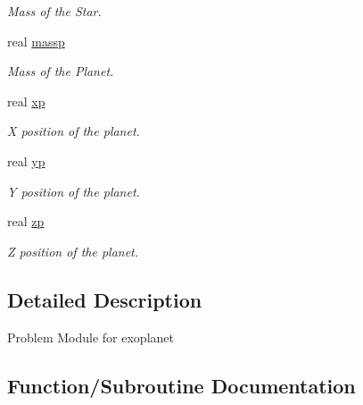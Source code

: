 \begin{DoxyCompactItemize}
\begin{DoxyCompactList}\small\item\em Mass of the Star. \end{DoxyCompactList}\item 
\hypertarget{namespaceexoplanet_a42dc35a9cdd9b1b8c10ddf245a1f2b8b}{}real \hyperlink{namespaceexoplanet_a42dc35a9cdd9b1b8c10ddf245a1f2b8b}{massp}\label{namespaceexoplanet_a42dc35a9cdd9b1b8c10ddf245a1f2b8b}

\begin{DoxyCompactList}\small\item\em Mass of the Planet. \end{DoxyCompactList}\item 
\hypertarget{namespaceexoplanet_a26bd2e233f9fb48ab288f5378aa12615}{}real \hyperlink{namespaceexoplanet_a26bd2e233f9fb48ab288f5378aa12615}{xp}\label{namespaceexoplanet_a26bd2e233f9fb48ab288f5378aa12615}

\begin{DoxyCompactList}\small\item\em X position of the planet. \end{DoxyCompactList}\item 
\hypertarget{namespaceexoplanet_a4beb49f2e3a5335b97cd702b68651fab}{}real \hyperlink{namespaceexoplanet_a4beb49f2e3a5335b97cd702b68651fab}{yp}\label{namespaceexoplanet_a4beb49f2e3a5335b97cd702b68651fab}

\begin{DoxyCompactList}\small\item\em Y position of the planet. \end{DoxyCompactList}\item 
\hypertarget{namespaceexoplanet_ad888a61279bbe33aed243934d0279253}{}real \hyperlink{namespaceexoplanet_ad888a61279bbe33aed243934d0279253}{zp}\label{namespaceexoplanet_ad888a61279bbe33aed243934d0279253}

\begin{DoxyCompactList}\small\item\em Z position of the planet. \end{DoxyCompactList}\end{DoxyCompactItemize}


\subsection{Detailed Description}
Problem Module for exoplanet 

\subsection{Function/\+Subroutine Documentation}
\hypertarget{namespaceexoplanet_a025d8839492b18a794c76b5018f43f91}{}
